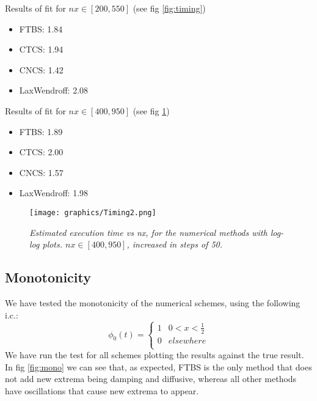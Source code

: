 Results of fit for $nx\in [200, 550]$ (see fig \ref{fig:timing})
\begin{itemize}
	\item FTBS: 1.84
	\item CTCS: 1.94
	\item CNCS: 1.42
	\item LaxWendroff: 2.08
\end{itemize}

Results of fit for $nx\in [400, 950]$ (see fig \ref{fig:timing2})
\begin{itemize}
\item FTBS: 1.89
\item CTCS: 2.00
\item CNCS: 1.57
\item LaxWendroff: 1.98
\end{itemize}

\begin{figure}[H]
	\begin{center}
		\texttt{[image: graphics/Timing2.png]}
	\end{center}%
	\caption[computational cost of numerical methods]{ \em Estimated execution time vs nx, for the numerical methods with log-log plots.  $nx\in [400, 950]$, increased in steps of 50.}
	\label{fig:timing2}
\end{figure}

\subsection{Monotonicity}
\label{sec:mono}
We have tested the monotonicity of the numerical schemes, using the following i.c.:
\begin{equation}
\phi_0(t)=\left\{
\begin{array}{lr}
1 & 0<x<\frac{1}{2} \\
0 &  elsewhere \\
\end{array}
\right.
\label{eq:initcondsquare}
\end{equation}
We have run the test for all schemes plotting the results against the true result. In fig \ref{fig:mono} we can see that, as expected, FTBS is the only method that does not add new extrema being damping and diffusive, whereas all other methods have oscillations that cause new extrema to appear.
